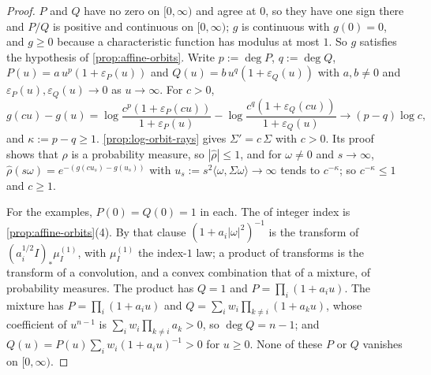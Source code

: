 \begin{proof}
\leanok
$P$ and $Q$ have no zero on $[0,\infty)$ and agree at $0$, so they have one sign there and $P/Q$ is
positive and continuous on $[0,\infty)$; $g$ is continuous with $g(0) = 0$, and $g \ge 0$ because a
characteristic function has modulus at most $1$. So $g$ satisfies the hypothesis of
\ref{prop:affine-orbits}. Write $p := \operatorname{deg}P$, $q := \operatorname{deg}Q$, $P(u) = a\,u^p(1 + \varepsilon_P(u))$ and
$Q(u) = b\,u^q(1 + \varepsilon_Q(u))$ with $a, b \ne 0$ and $\varepsilon_P(u), \varepsilon_Q(u) \to 0$
as $u \to \infty$. For $c > 0$,
\[
  g(cu) - g(u) = \log\frac{c^p(1 + \varepsilon_P(cu))}{1 + \varepsilon_P(u)}
   - \log\frac{c^q(1 + \varepsilon_Q(cu))}{1 + \varepsilon_Q(u)} \to (p - q)\log c ,
\]
and $\kappa := p - q \ge 1$. \ref{prop:log-orbit-rays} gives $\Sigma' = c\,\Sigma$ with $c > 0$. Its
proof shows that $\rho$ is a probability measure, so $|\widehat\rho| \le 1$, and for $\omega \ne 0$
and $s \to \infty$, $\widehat\rho(s\omega) = e^{-(g(cu_s) - g(u_s))}$ with
$u_s := s^2\langle\omega,\Sigma\omega\rangle \to \infty$ tends to $c^{-\kappa}$; so $c^{-\kappa} \le 1$
and $c \ge 1$.

For the examples, $P(0) = Q(0) = 1$ in each. The \Matern{} of integer index is
\ref{prop:affine-orbits}(4). By that clause $(1 + a_i|\omega|^2)^{-1}$ is the transform of
$(a_i^{1/2}I)_*\mu^{(1)}_I$, with $\mu^{(1)}_I$ the index-$1$ law; a product of transforms is the
transform of a convolution, and a convex combination that of a mixture, of probability measures. The
product has $Q = 1$ and $P = \prod_i(1 + a_iu)$. The mixture has $P = \prod_i(1 + a_iu)$ and
$Q = \sum_iw_i\prod_{k\ne i}(1 + a_ku)$, whose coefficient of $u^{n-1}$ is
$\sum_iw_i\prod_{k\ne i}a_k > 0$, so $\operatorname{deg}Q = n - 1$; and $Q(u) = P(u)\sum_iw_i(1 + a_iu)^{-1} > 0$
for $u \ge 0$. None of these $P$ or $Q$ vanishes on $[0,\infty)$.
\end{proof}

